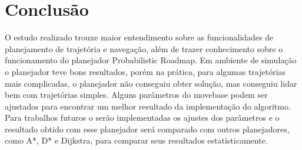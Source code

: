 \chapter{Conclusão}
\label{chap:conc}

O estudo realizado trouxe maior entendimento sobre as funcionalidades de planejamento de trajetória e navegação, além de trazer conhecimento sobre o funcionamento do planejador Probabilistic Roadmap. Em ambiente de simulação o planejador teve bons resultados, porém na prática, para algumas trajetórias mais complicadas, o planejador não conseguiu obter solução, mas conseguiu lidar bem com trajetórias simples. Alguns parâmetros do move\textunderscore base podem ser ajustados para encontrar um melhor resultado da implementação do algoritmo. Para trabalhos futuros o serão implementadas os ajustes dos parâmetros e o resultado obtido com esse planejador será comparado com outros planejadores, como A*, D* e Dijkstra, para comparar seus resultados estatisticamente.